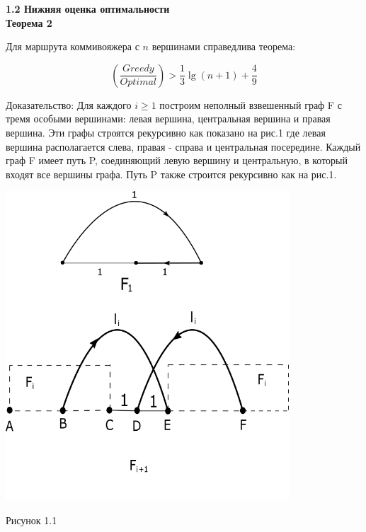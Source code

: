 \documentclass[a4paper, 14pt]{extarticle}
\begin{document}
\textbf{1.2 Нижняя оценка оптимальности}\\


\textbf{Теорема 2}

Для маршрута коммивояжера с $n$ вершинами справедлива теорема:

\begin{equation}
	(\frac{Greedy}{Optimal}) > \frac{1}{3}{\lg (n+1)} + \frac{4}{9}
\end{equation}

Доказательство:  Для каждого $i \geq 1 $ построим неполный взвешенный граф F с тремя особыми вершинами: левая вершина, центральная вершина и правая вершина. Эти графы строятся рекурсивно как показано на рис.1 где левая вершина располагается слева, правая - справа и центральная посередине. Каждый граф F имеет путь P, соединяющий левую вершину и центральную, в который входят все вершины графа. Путь P также строится рекурсивно как на рис.1. 

\begin{center}
\includegraphics[width=300pt]{ris1.png}
\end{center}

\begin{center}
Рисунок 1.1
\end{center}
\end{document}
